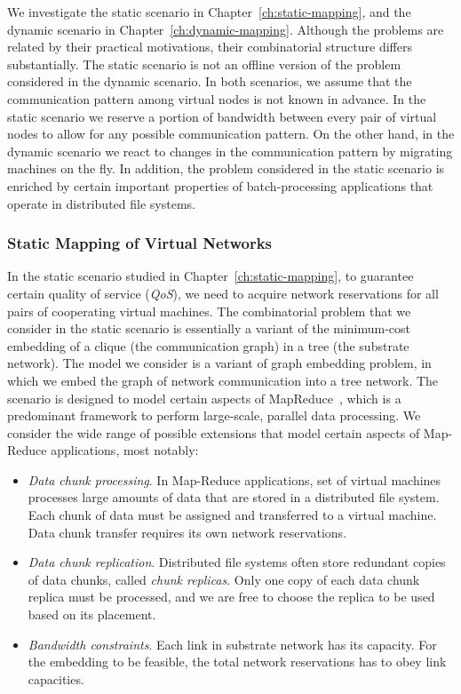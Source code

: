 We investigate the static scenario in Chapter~\ref{ch:static-mapping}, and the dynamic scenario in Chapter~\ref{ch:dynamic-mapping}.
Although the problems are related by their practical motivations, their combinatorial structure differs substantially.
The static scenario is not an offline version of the problem considered in the dynamic scenario.
In both scenarios, we assume that the communication pattern among virtual nodes is not known in advance.
In the static scenario we reserve a portion of bandwidth between every pair of virtual nodes to allow for any possible communication pattern.
On the other hand, in the dynamic scenario we react to changes in the communication pattern by migrating machines on the fly.
In addition, the problem considered in the static scenario is enriched by certain important properties of batch-processing applications that operate in distributed file systems.


\subsubsection{Static Mapping of Virtual Networks}
\label{sec:contributions-static-mapping}

In the static scenario studied in Chapter~\ref{ch:static-mapping}, to guarantee certain quality of service (\emph{QoS}), we need to acquire network reservations for all pairs of cooperating virtual machines.
The combinatorial problem that we consider in the static scenario is essentially a variant of the minimum-cost embedding of a clique (the communication graph) in a tree (the substrate network).
The model we consider is a variant of graph embedding problem, in which we embed the graph of network communication into a tree network.
The scenario is designed to model certain aspects of MapReduce~\cite{mapreduce}, which is a predominant framework to perform large-scale, parallel data processing.
We consider the wide range of possible extensions that model certain aspects of Map-Reduce applications, most notably:

\begin{itemize}
\item \emph{Data chunk processing}. In Map-Reduce applications, set of virtual machines processes large amounts of data that are stored in a distributed file system. Each chunk of data must be assigned and transferred to a virtual machine. Data chunk transfer requires its own network reservations.

\item \emph{Data chunk replication}. Distributed file systems often store redundant copies of data chunks, called \emph{chunk replicas}. Only one copy of each data chunk replica must be processed, and we are free to choose the replica to be used based on its placement.

\item \emph{Bandwidth constraints}. Each link in substrate network has its capacity. For the embedding to be feasible, the total network reservations has to obey link capacities.
\end{itemize}


